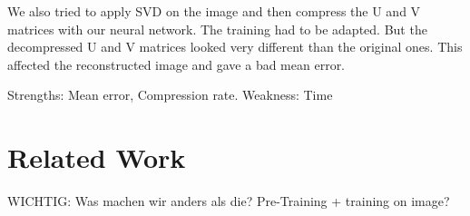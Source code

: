 \documentclass[10pt,conference,compsocconf]{IEEEtran}
\begin{document}
We also tried to apply SVD on the image and then compress the U and V matrices with our neural network. The training had to be adapted. But the decompressed U and V matrices looked very different than the original ones. This affected the reconstructed image and gave a bad mean error.\newline

Strengths: Mean error, Compression rate. \newline
Weakness: Time




\section{Related Work}
WICHTIG: Was machen wir anders als die? Pre-Training + training on image?



\end{document}
